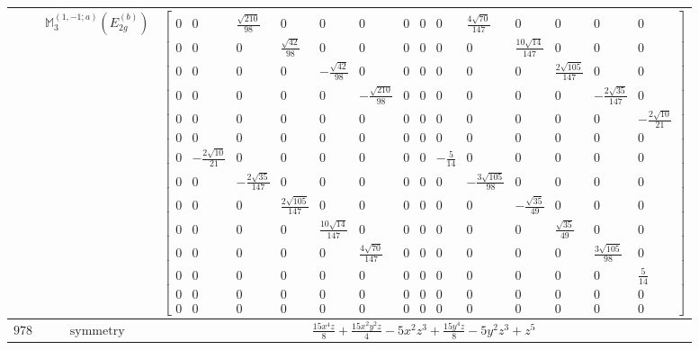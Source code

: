 \documentclass[fleqn,8pt,landscape]{jsarticle}
\begin{document}
\begin{longtable}{ccc}
$  $ & $ \mathbb{M}_{3}^{(1,-1;a)}(E_{2g}^{(b)}) $ & $ \begin{bmatrix} 0 & 0 & \frac{\sqrt{210}}{98} & 0 & 0 & 0 & 0 & 0 & 0 & \frac{4 \sqrt{70}}{147} & 0 & 0 & 0 & 0 \\ 0 & 0 & 0 & \frac{\sqrt{42}}{98} & 0 & 0 & 0 & 0 & 0 & 0 & \frac{10 \sqrt{14}}{147} & 0 & 0 & 0 \\ 0 & 0 & 0 & 0 & - \frac{\sqrt{42}}{98} & 0 & 0 & 0 & 0 & 0 & 0 & \frac{2 \sqrt{105}}{147} & 0 & 0 \\ 0 & 0 & 0 & 0 & 0 & - \frac{\sqrt{210}}{98} & 0 & 0 & 0 & 0 & 0 & 0 & - \frac{2 \sqrt{35}}{147} & 0 \\ 0 & 0 & 0 & 0 & 0 & 0 & 0 & 0 & 0 & 0 & 0 & 0 & 0 & - \frac{2 \sqrt{10}}{21} \\ 0 & 0 & 0 & 0 & 0 & 0 & 0 & 0 & 0 & 0 & 0 & 0 & 0 & 0 \\ 0 & - \frac{2 \sqrt{10}}{21} & 0 & 0 & 0 & 0 & 0 & 0 & - \frac{5}{14} & 0 & 0 & 0 & 0 & 0 \\ 0 & 0 & - \frac{2 \sqrt{35}}{147} & 0 & 0 & 0 & 0 & 0 & 0 & - \frac{3 \sqrt{105}}{98} & 0 & 0 & 0 & 0 \\ 0 & 0 & 0 & \frac{2 \sqrt{105}}{147} & 0 & 0 & 0 & 0 & 0 & 0 & - \frac{\sqrt{35}}{49} & 0 & 0 & 0 \\ 0 & 0 & 0 & 0 & \frac{10 \sqrt{14}}{147} & 0 & 0 & 0 & 0 & 0 & 0 & \frac{\sqrt{35}}{49} & 0 & 0 \\ 0 & 0 & 0 & 0 & 0 & \frac{4 \sqrt{70}}{147} & 0 & 0 & 0 & 0 & 0 & 0 & \frac{3 \sqrt{105}}{98} & 0 \\ 0 & 0 & 0 & 0 & 0 & 0 & 0 & 0 & 0 & 0 & 0 & 0 & 0 & \frac{5}{14} \\ 0 & 0 & 0 & 0 & 0 & 0 & 0 & 0 & 0 & 0 & 0 & 0 & 0 & 0 \\ 0 & 0 & 0 & 0 & 0 & 0 & 0 & 0 & 0 & 0 & 0 & 0 & 0 & 0 \end{bmatrix} $ \\ \hline
$ 978 $ & $ \text{symmetry} $ & $ \frac{15 x^{4} z}{8} + \frac{15 x^{2} y^{2} z}{4} - 5 x^{2} z^{3} + \frac{15 y^{4} z}{8} - 5 y^{2} z^{3} + z^{5} $ \\

\end{longtable}
\end{document}
